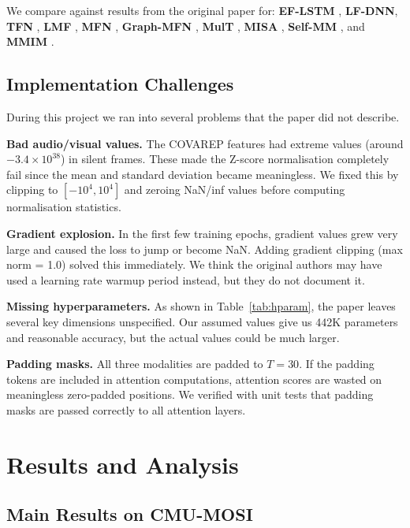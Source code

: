 \documentclass[11pt,twocolumn]{article}
\begin{document}
We compare against results from the original paper for: \textbf{EF-LSTM} \citep{zadeh2016multimodal}, \textbf{LF-DNN}, \textbf{TFN} \citep{zadeh2017tensor}, \textbf{LMF} \citep{liu2018efficient}, \textbf{MFN} \citep{zadeh2018memory}, \textbf{Graph-MFN} \citep{zadeh2018multimodal}, \textbf{MulT} \citep{tsai2019multimodal}, \textbf{MISA} \citep{hazarika2021misa}, \textbf{Self-MM} \citep{yu2021selfmm}, and \textbf{MMIM} \citep{han2021improving}.

\subsection{Implementation Challenges}

During this project we ran into several problems that the paper did not describe.

\textbf{Bad audio/visual values.} The COVAREP features had extreme values (around $-3.4 \times 10^{38}$) in silent frames. These made the Z-score normalisation completely fail since the mean and standard deviation became meaningless. We fixed this by clipping to $[-10^4, 10^4]$ and zeroing NaN/inf values before computing normalisation statistics.

\textbf{Gradient explosion.} In the first few training epochs, gradient values grew very large and caused the loss to jump or become NaN. Adding gradient clipping (max norm = 1.0) solved this immediately. We think the original authors may have used a learning rate warmup period instead, but they do not document it.

\textbf{Missing hyperparameters.} As shown in Table~\ref{tab:hparam}, the paper leaves several key dimensions unspecified. Our assumed values give us 442K parameters and reasonable accuracy, but the actual values could be much larger.

\textbf{Padding masks.} All three modalities are padded to $T = 30$. If the padding tokens are included in attention computations, attention scores are wasted on meaningless zero-padded positions. We verified with unit tests that padding masks are passed correctly to all attention layers.

\section{Results and Analysis}
\label{sec:results}

\subsection{Main Results on CMU-MOSI}
\end{document}
